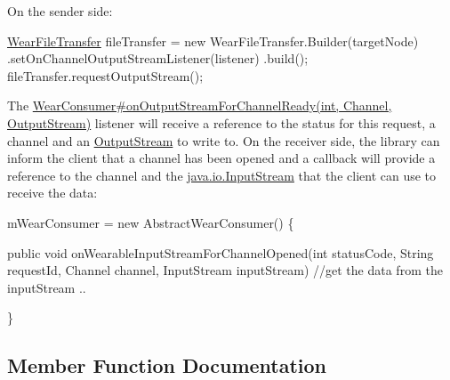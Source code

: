 On the sender side\+: 
\begin{DoxyPre}
\hyperlink{classcom_1_1google_1_1devrel_1_1wcl_1_1connectivity_1_1WearFileTransfer}{WearFileTransfer} fileTransfer = new WearFileTransfer.Builder(targetNode)
       .setOnChannelOutputStreamListener(listener)
       .build();
fileTransfer.requestOutputStream();
\end{DoxyPre}
 The \hyperlink{interfacecom_1_1google_1_1devrel_1_1wcl_1_1connectivity_1_1WearFileTransfer_1_1OnWearableChannelOutputStreamListener_abcb9123c27d9ece5365b99571a708f60}{Wear\+Consumer\#on\+Output\+Stream\+For\+Channel\+Ready(int, Channel, Output\+Stream)} listener will receive a reference to the status for this request, a channel and an \hyperlink{}{Output\+Stream} to write to. On the receiver side, the library can inform the client that a channel has been opened and a callback will provide a reference to the channel and the \hyperlink{}{java.\+io.\+Input\+Stream} that the client can use to receive the data\+: 
\begin{DoxyPre}
mWearConsumer = new AbstractWearConsumer() \{
\begin{DoxyVerb}    public void onWearableInputStreamForChannelOpened(int statusCode, String requestId,
        Channel channel, InputStream inputStream) {
            //get the data from the inputStream ..
    }
\end{DoxyVerb}

\}
\end{DoxyPre}
 

\subsection{Member Function Documentation}
